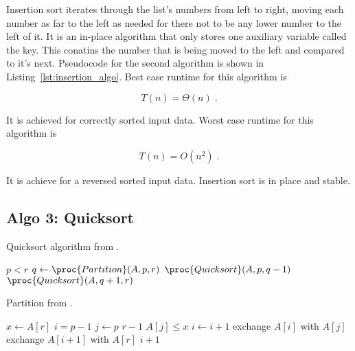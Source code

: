 \documentclass[twocolumn, sigconf, nonacm, natbib, screen, balance=False]{acmart}
\begin{document}
Insertion sort iterates through the list’s numbers from left to right, moving each number as far to the left as needed for there not to be any lower number to the left of it. It is an in-place algorithm that only stores one auxiliary variable called the key. This conatins the number that is being moved to the left and compared to it’s next.
Pseudocode for the second algorithm is shown in
Listing~\ref{lst:insertion_algo}. Best case runtime for this algorithm
is

\begin{equation}
  T(n) = \Theta(n) \;.  \label{eq:ins_sort_best}
\end{equation}

It is achieved for correctly sorted input data. Worst case runtime for this algorithm is

\begin{equation}
  T(n) = O(n^2) \;.  \label{eq:ins_sort_worst}
\end{equation}

It is achieve for a reversed sorted input data. Insertion sort is in place and stable. 

\subsection{Algo 3: Quicksort}\label{sec:algo3}

\begin{listing}
  \caption{Quicksort algorithm from \citet[Ch.~2.1]{CLRS_2009}.}
  \label{lst:quicksort_algo}
  \begin{codebox}
    \li \If $p < r$
    \li \Then $q \gets \proc{Partition}(A, p, r)$
    \li     $\proc{Quicksort}(A, p, q - 1)$
    \li     $\proc{Quicksort}(A, q + 1, r)$
    \End
  \end{codebox}
\end{listing}

\begin{listing}
  \caption{Partition from \citet[Ch.~2.1]{CLRS_2009}.}
  \label{lst:partition}
  \begin{codebox}
    \li $x \gets A[r]$
    \li $i = p - 1$
    \li \For $j \gets p$ \To $r - 1$
    \li \Do \If $A[j] \le x$
    \li  	\Then $i \gets i + 1$
    \li     exchange $A[i]$ with $A[j]$
    \End
    \End
    \li exchange $A[i + 1]$ with $A[r]$
    \li \Return $i + 1$
  \end{codebox}
\end{listing}
\end{document}
